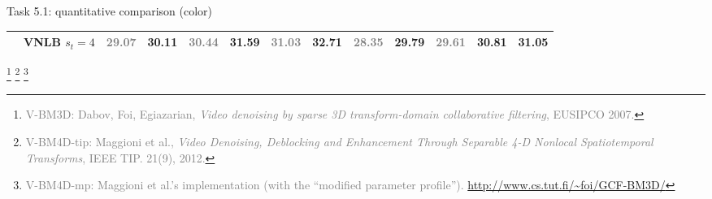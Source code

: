 \documentclass[mathserif, 8pt]{beamer}
\newcommand{\best}[1]{#1}
\newcommand{\bsic}[1]{\textcolor{gray}{#1}}
\newcommand{\Bsic}[1]{\textcolor{gray}{\textbf{#1}}}
\newcommand{\Best}[1]{\textbf{\textcolor{MyOrangeBrighter}{#1}}}
\begin{document}
\begin{frame}{Task 5.1: quantitative comparison (color)}
\begin{center}
{\begin{tabular}{ c | l |c c | c c | c c | c c | c c | c}
			                      & VNLB   $s_t = 4$     & \Bsic{29.07} & \Best{30.11} & \Bsic{30.44} & \Best{31.59} & \Bsic{31.03} & \Best{32.71} & \Bsic{28.35} & \Best{29.79} & \Bsic{29.61} & \best{30.81} & \Best{31.05} \\\hline
		\end{tabular}}
	\end{center}

	\let\thefootnote\relax\footnote[frame]{\textcolor{gray}{V-BM3D: Dabov, Foi,
		Egiazarian, \emph{Video denoising by sparse 3D transform-domain
		collaborative filtering}, EUSIPCO 2007.}}
	\let\thefootnote\relax\footnote[frame]{\textcolor{gray}{V-BM4D-tip: Maggioni
		et al., \emph{Video Denoising, Deblocking and Enhancement Through
		Separable 4-D Nonlocal Spatiotemporal Transforms}, IEEE TIP. 21(9),
		2012.}}
	\let\thefootnote\relax\footnote[frame]{\textcolor{gray}{V-BM4D-mp: Maggioni
		et al.'s implementation (with the ``modified parameter profile'').
		\url{http://www.cs.tut.fi/~foi/GCF-BM3D/}}}

\end{frame}
\end{document}
